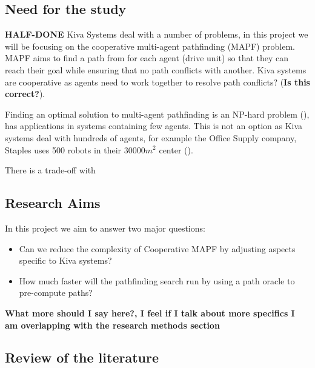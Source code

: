 \documentclass[a4paper,11pt]{article}
\begin{document}
\subsection{Need for the study}


\textbf{HALF-DONE}
Kiva Systems deal with a number of problems, in this project we will be focusing on the cooperative multi-agent pathfinding (MAPF) problem. MAPF aims to find a path from for each agent (drive unit) so that they can reach their goal while ensuring that no path conflicts with another. Kiva systems are cooperative as agents need to work together to resolve path conflicts? (\textbf{Is this correct?}).

Finding an optimal solution to multi-agent pathfinding is an NP-hard problem (\cite{yu2013structure}), has applications in systems containing few agents. This is not an option as Kiva systems deal with hundreds of agents, for example the Office Supply company, Staples uses 500 robots in their 30000$m^{2}$ center (\cite{guizzo2008three}).

There is a trade-off with 

\subsection{Research Aims}
In this project we aim to answer two major questions:
\begin{itemize}
	\item Can we reduce the complexity of Cooperative MAPF by adjusting aspects specific to Kiva systems?
	\item How much faster will the pathfinding search run by using a path oracle to pre-compute paths?
\end{itemize}

\textbf{What more should I say here?, I feel if I talk about more specifics I am overlapping with the research methods section}

\subsection{Review of the literature}
\end{document}
